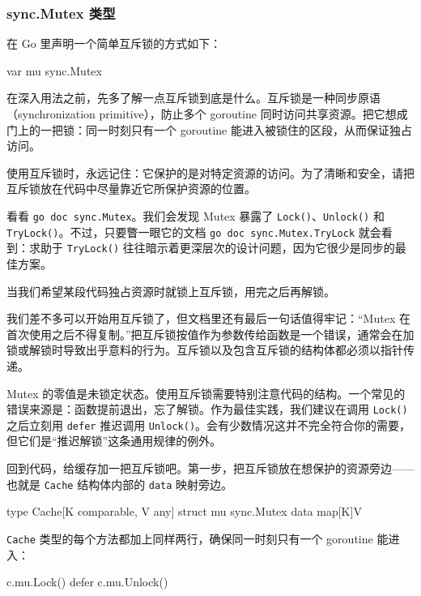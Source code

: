 \subsubsection*{sync.Mutex 类型}

在 Go 里声明一个简单互斥锁的方式如下：

\begin{gocode}[]
var mu sync.Mutex
\end{gocode}

在深入用法之前，先多了解一点互斥锁到底是什么。互斥锁是一种同步原语（synchronization primitive），防止多个 goroutine 同时访问共享资源。把它想成门上的一把锁：同一时刻只有一个 goroutine 能进入被锁住的区段，从而保证独占访问。

使用互斥锁时，永远记住：它保护的是对特定资源的访问。为了清晰和安全，请把互斥锁放在代码中尽量靠近它所保护资源的位置。

看看 \texttt{go doc sync.Mutex}。我们会发现 Mutex 暴露了 \texttt{Lock()}、\texttt{Unlock()} 和 \texttt{TryLock()}。不过，只要瞥一眼它的文档 \texttt{go doc sync.Mutex.TryLock} 就会看到：求助于 \texttt{TryLock()} 往往暗示着更深层次的设计问题，因为它很少是同步的最佳方案。

当我们希望某段代码独占资源时就锁上互斥锁，用完之后再解锁。

我们差不多可以开始用互斥锁了，但文档里还有最后一句话值得牢记：``Mutex 在首次使用之后不得复制。''把互斥锁按值作为参数传给函数是一个错误，通常会在加锁或解锁时导致出乎意料的行为。互斥锁以及包含互斥锁的结构体都必须以指针传递。

Mutex 的零值是未锁定状态。使用互斥锁需要特别注意代码的结构。一个常见的错误来源是：函数提前退出，忘了解锁。作为最佳实践，我们建议在调用 \texttt{Lock()} 之后立刻用 \texttt{defer} 推迟调用 \texttt{Unlock()}。会有少数情况这并不完全符合你的需要，但它们是``推迟解锁''这条通用规律的例外。

回到代码，给缓存加一把互斥锁吧。第一步，把互斥锁放在想保护的资源旁边——也就是 \texttt{Cache} 结构体内部的 \texttt{data} 映射旁边。

\begin{gocode}[title={代码清单 7.11 \texttt{cache.go}：带互斥锁的缓存}]
type Cache[K comparable, V any] struct {
    mu   sync.Mutex
    data map[K]V
}
\end{gocode}

\texttt{Cache} 类型的每个方法都加上同样两行，确保同一时刻只有一个 goroutine 能进入：

\begin{gocode}[]
c.mu.Lock()
defer c.mu.Unlock()
\end{gocode}

